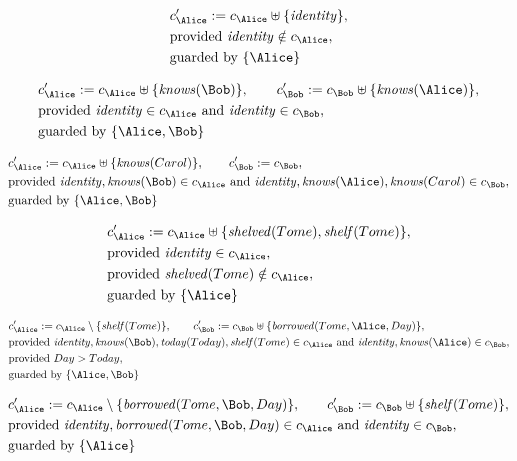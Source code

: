 \begin{align*}
&
c'_
{
\Alice
}
 := 
c_
{
\Alice
}
 \uplus 
\{
\mathit{
identity
}
\}
,\\
&
\text{provided } 
\mathit{
identity
}
 \notin c_
{
\Alice
}
,\\
&
\text{guarded by } \{
\Alice
\}
\end{align*}

\begin{align*}
&
c'_
{
\Alice
}
 := 
c_
{
\Alice
}
 \uplus 
\{
\mathit{
knows
}
(
\Bob
)
\}
, \qquad 
c'_
{
\Bob
}
 := 
c_
{
\Bob
}
 \uplus 
\{
\mathit{
knows
}
(
\Alice
)
\}
,\\
&
\text{provided } 
\mathit{
identity
}
 \in c_
{
\Alice
}
 \text{ and } 
\mathit{
identity
}
 \in c_
{
\Bob
}
,\\
&
\text{guarded by } \{
\Alice
,
\Bob
\}
\end{align*}

\begin{align*}
&
c'_
{
\Alice
}
 := 
c_
{
\Alice
}
 \uplus 
\{
\mathit{
knows
}
(
Carol
)
\}
, \qquad 
c'_
{
\Bob
}
 := 
c_
{
\Bob
}
,\\
&
\text{provided } 
\mathit{
identity
}
,
\mathit{
knows
}
(
\Bob
)
 \in c_
{
\Alice
}
 \text{ and } 
\mathit{
identity
}
,
\mathit{
knows
}
(
\Alice
)
,
\mathit{
knows
}
(
Carol
)
 \in c_
{
\Bob
}
,\\
&
\text{guarded by } \{
\Alice
,
\Bob
\}
\end{align*}

\begin{align*}
&
c'_
{
\Alice
}
 := 
c_
{
\Alice
}
 \uplus 
\{
\mathit{
shelved
}
(
Tome
)
,
\mathit{
shelf
}
(
Tome
)
\}
,\\
&
\text{provided } 
\mathit{
identity
}
 \in c_
{
\Alice
}
,\\
&
\text{provided } 
\mathit{
shelved
}
(
Tome
)
 \notin c_
{
\Alice
}
,\\
&
\text{guarded by } \{
\Alice
\}
\end{align*}

\begin{align*}
&
c'_
{
\Alice
}
 := 
c_
{
\Alice
}
 \setminus 
\{
\mathit{
shelf
}
(
Tome
)
\}
, \qquad 
c'_
{
\Bob
}
 := 
c_
{
\Bob
}
 \uplus 
\{
\mathit{
borrowed
}
(
Tome
,
\Alice
,
Day
)
\}
,\\
&
\text{provided } 
\mathit{
identity
}
,
\mathit{
knows
}
(
\Bob
)
,
\mathit{
today
}
(
Today
)
,
\mathit{
shelf
}
(
Tome
)
 \in c_
{
\Alice
}
 \text{ and } 
\mathit{
identity
}
,
\mathit{
knows
}
(
\Alice
)
 \in c_
{
\Bob
}
,\\
&
\text{provided } 
Day
>
Today
,\\
&
\text{guarded by } \{
\Alice
,
\Bob
\}
\end{align*}

\begin{align*}
&
c'_
{
\Alice
}
 := 
c_
{
\Alice
}
 \setminus 
\{
\mathit{
borrowed
}
(
Tome
,
\Bob
,
Day
)
\}
, \qquad 
c'_
{
\Bob
}
 := 
c_
{
\Bob
}
 \uplus 
\{
\mathit{
shelf
}
(
Tome
)
\}
,\\
&
\text{provided } 
\mathit{
identity
}
,
\mathit{
borrowed
}
(
Tome
,
\Bob
,
Day
)
 \in c_
{
\Alice
}
 \text{ and } 
\mathit{
identity
}
 \in c_
{
\Bob
}
,\\
&
\text{guarded by } \{
\Alice
\}
\end{align*}
